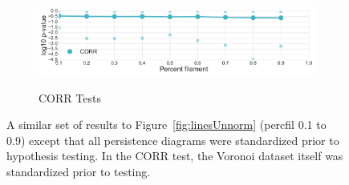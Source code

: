 \documentclass[12pt]{article}
\newcommand{\figref}[1]{Figure~\ref{#1}}
\begin{document}
\begin{description}
\begin{center}
\begin{figure}[htp!]
\begin{subfigure}{.5\textwidth}
        \label{fig:all_weight}
      \end{subfigure}
      \begin{subfigure}{.5\textwidth}
        \caption{CORR Tests}
        \includegraphics[width=\linewidth]{figure_8_all_correlation_group_normed.pdf}
        \label{fig:all_corr}
      \end{subfigure}
      \caption{A similar set of results to \figref{fig:linesUnnorm} (percfil 0.1 to 0.9) except that all persistence diagrams were standardized prior to hypothesis testing. In the CORR test, the Voronoi dataset itself was standardized prior to testing.}
      \label{fig:linesNorm}
    \end{figure}
  \end{center}
\end{description}




\end{document}
